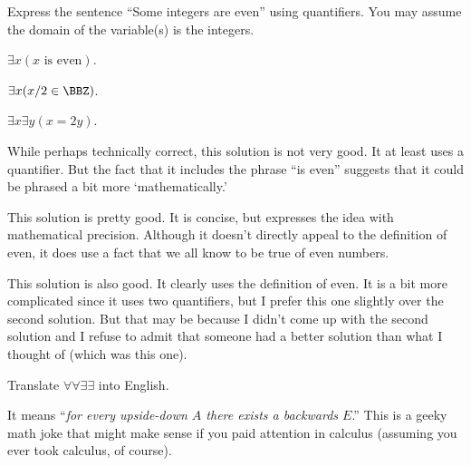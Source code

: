 \vspace*{-.1in}

\begin{eval}
Express the sentence ``Some integers are even'' using quantifiers.
You may assume the domain of the variable(s) is the integers.
\begin{ssolenum}
\item
$\exists x(x \mbox{ is even})$.\\
\evallinetwo
\item
$\exists x(x/2\in\BBZ)$.\\
\evallinetwo
\item
$\exists x\exists y (x=2y)$.\\
\evallinetwo
\end{ssolenum}
\begin{answer}
\begin{solevalenum}
\item
While perhaps technically correct, this solution is not very good.  It at least uses a quantifier.
But the fact that it includes the phrase ``is even'' suggests that it could be phrased a bit more `mathematically.'
\item
This solution is pretty good.  It is concise, but expresses the idea with mathematical precision.
Although it doesn't directly appeal to the definition of even, it does use a fact that we all know to be
true of even numbers.
\item
This solution is also good.  It clearly uses the definition of even. It is a bit more complicated
since it uses two quantifiers, but I prefer this one slightly over the second solution.  
But that may be because I didn't come up with the second solution and I refuse to admit that
someone had a better solution than what I thought of (which was this one).
\end{solevalenum}
\end{answer}
\end{eval}

\vspace*{-.1in}

\begin{exa}
Translate $\forall \forall \exists\exists$ into English.
\begin{sol}
It means ``{\em for every upside-down $A$ there exists a backwards $E$}.''
This is a geeky math joke that might make sense if you paid attention
in calculus (assuming you ever took calculus, of course).  
\end{sol}
\end{exa}

